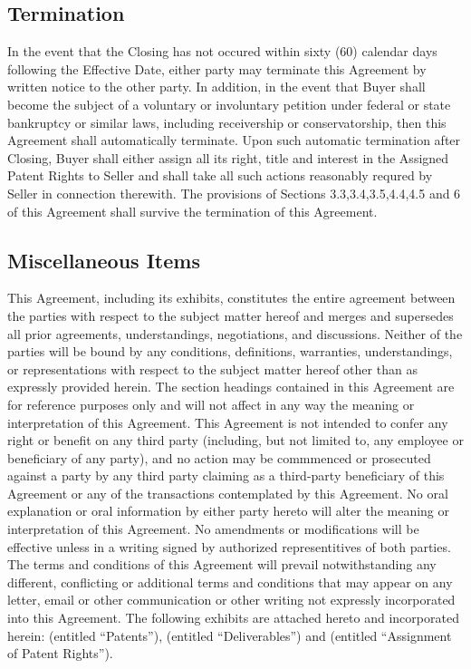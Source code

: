 \documentclass[letterpaper,10pt,openany,oneside,english]{sphinxmanual}
\begin{document}
\subsection{Termination}
\label{\detokenize{7-miscellaneous:termination}}
In the event that the Closing has not occured within sixty (60) calendar days following the Effective Date, either party may terminate this Agreement by written notice to the other party. In addition, in the event that Buyer shall become the subject of a voluntary or involuntary petition under federal or state bankruptcy or similar laws, including receivership or conservatorship, then this Agreement shall automatically terminate. Upon such automatic termination after Closing, Buyer shall either assign all its right, title and interest in the Assigned Patent Rights to Seller and shall take all such actions reasonably requred by Seller in connection therewith. The provisions of Sections 3.3,3.4,3.5,4.4,4.5 and 6 of this Agreement shall survive the termination of this Agreement.


\subsection{Miscellaneous Items}
\label{\detokenize{7-miscellaneous:miscellaneous-items}}
This Agreement, including its exhibits, constitutes the entire agreement between the parties with respect to the subject matter hereof and merges and supersedes all prior agreements, understandings, negotiations, and discussions. Neither of the parties will be bound by any conditions, definitions, warranties, understandings, or representations with respect to the subject matter hereof other than as expressly provided herein. The section headings contained in this Agreement are for reference purposes only and will not affect in any way the meaning or interpretation of this Agreement. This Agreement is not intended to confer any right or benefit on any third party (including, but not limited to, any employee or beneficiary of any party), and no action may be commmenced or prosecuted against a party by any third party claiming as a third-party beneficiary of this Agreement or any of the transactions contemplated by this Agreement. No oral explanation or oral information by either party hereto will alter the meaning or interpretation of this Agreement. No amendments or modifications will be effective unless in a writing signed by authorized representitives of both parties. The terms and conditions of this Agreement will prevail notwithstanding any different, conflicting or additional terms and conditions that may appear on any letter, email or other communication or other writing not expressly incorporated into this Agreement. The following exhibits are attached hereto and incorporated herein:  (entitled “Patents”),  (entitled “Deliverables”) and  (entitled “Assignment of Patent Rights”).
\end{document}
